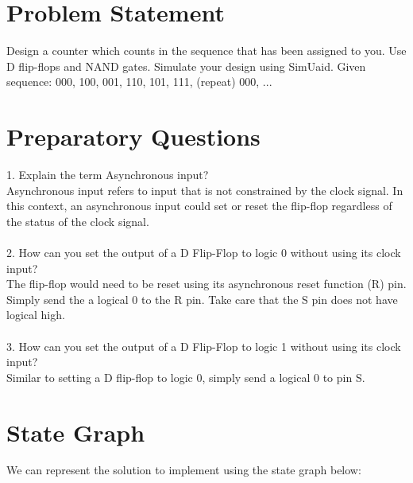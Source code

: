\documentclass{report}
\begin{document}

\section{Problem Statement}
Design a counter which counts in the sequence that has been assigned to you.
Use D flip-flops and NAND gates. Simulate your design using SimUaid. Given
sequence: 000, 100, 001, 110, 101, 111, (repeat) 000, ...

\section {Preparatory Questions}
1. Explain the term Asynchronous input?
\\\indent
Asynchronous input refers to input that is not constrained by the clock signal.
In this context, an asynchronous input could set or reset the flip-flop
regardless of the status of the clock signal.
\\\\
2. How can you set the output of a D Flip-Flop to logic 0 without using its clock
input?
\\\indent
The flip-flop would need to be reset using its asynchronous reset function (R)
pin. Simply send the a logical 0 to the R pin. Take care that the S pin does
not have logical high.
\\\\
3. How can you set the output of a D Flip-Flop to logic 1 without using its clock
input?
\\\indent
Similar to setting a D flip-flop to logic 0, simply send a logical 0 to pin S.

\section{State Graph}
We can represent the solution to implement using the state graph below:
\\\\
\end{document}
